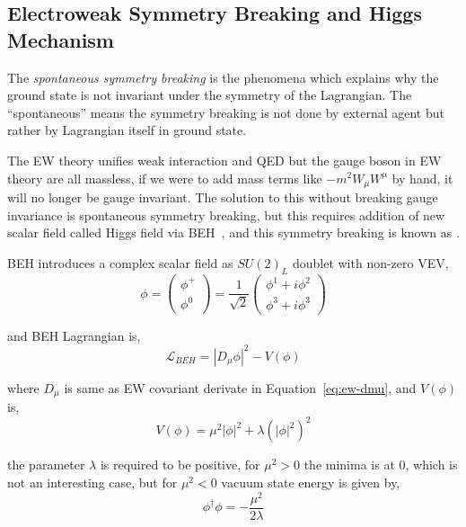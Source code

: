 \subsection{
  Electroweak Symmetry Breaking and Higgs Mechanism
}\label{ch_intro:ewsb}

The \textit{spontaneous symmetry breaking} is the phenomena which explains
why the ground state is not invariant under the symmetry
of the Lagrangian. The ``spontaneous'' means the symmetry
breaking is not done by external agent but rather by Lagrangian itself
in ground state.

The \gls{EW} theory unifies weak interaction and \gls{QED} but the
gauge boson in \gls{EW} theory are all massless, if we were to add mass
terms like \( - m^{2} W_{\mu} W^{\mu} \) by hand, it will no longer
be gauge invariant. The solution to this without breaking gauge invariance
is spontaneous symmetry breaking, but this requires addition of new scalar
field called Higgs field via \gls{BEH}~\cite{Englert1964,Higgs1964}, and this
symmetry breaking is known as .

\gls{BEH} introduces a complex scalar field as \( {SU(2)}_L \)
doublet with non-zero \gls{VEV},
%
\begin{equation}
  \phi = \left( \begin{matrix}
      \phi^{+} \\
      \phi^{0}
    \end{matrix} \right)
  = \frac{1}{\sqrt{2}}
  \left( \begin{matrix}
      \phi^{1} + i \phi^{2} \\
      \phi^{3} + i \phi^{3}
    \end{matrix} \right)
\end{equation}

and \gls{BEH} Lagrangian is,
%
\begin{equation}
  \mathcal{L}_{BEH} = {| D_{\mu} \phi |}^{2} - V(\phi)
\end{equation}

where \( D_{\mu} \) is same as \gls{EW} covariant derivate
in Equation~\ref{eq:ew-dmu}, and \( V(\phi) \) is,
%
\begin{equation}
  V(\phi) = \mu^{2} |\phi|^{2} + {\lambda (|\phi|^{2})}^{2}
\end{equation}

the parameter \( \lambda \) is required to be positive,
for \( \mu^2 > 0\) the minima is at 0, which is not an interesting case,
but for \( \mu^2 < 0\) vacuum state energy is given by,
%
\begin{equation}
  \phi^{\dagger} \phi = - \frac{\mu^{2}}{2 \lambda}
\end{equation}

